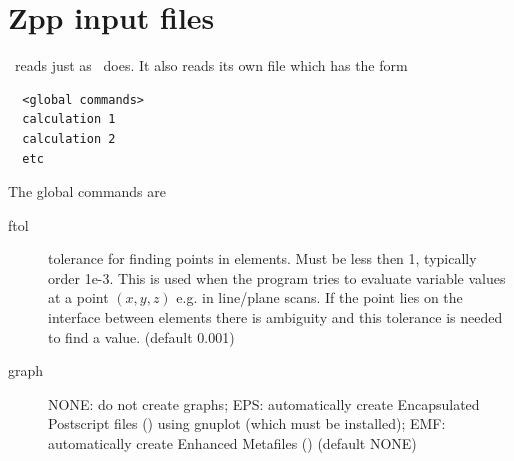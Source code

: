 \documentclass[a4paper,twoside,11pt]{book}
\begin{document}
\section{Zpp input files}
\label{zppinput}

\zpp\ reads  just as
\zinc\ does. It also reads its own file  which has
the form
\begin{verbatim}
  <global commands>
  calculation 1
  calculation 2
  etc
\end{verbatim}

The global commands are

\begin{description}
\item[ftol] tolerance for finding points in elements. Must be less
then 1, typically order 1e-3. This is used when the program tries to
evaluate variable values at a point $(x,y,z)$ e.g. in line/plane
scans. If the point lies on the interface between elements there is
ambiguity and this tolerance is needed to find a value. (default 0.001)

\item[graph] NONE: do not create graphs; EPS: automatically create Encapsulated
  Postscript files () using gnuplot (which must be
  installed); EMF: automatically create Enhanced Metafiles () (default NONE)
\end{description}
\end{document}
